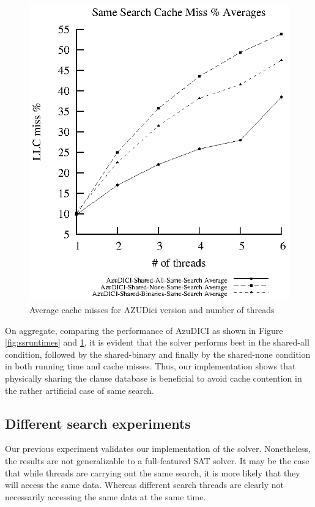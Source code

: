 \begin{figure}[htp]
  \centering
  \includegraphics[scale=1]{averageSS}
  \caption{Average cache misses for AZUDici version and number of
    threads}
  \label{fig:sscachemisses}
\end{figure}

On aggregate, comparing the performance of AzuDICI as shown in Figure
\ref{fig:ssruntimes} and \ref{fig:sscachemisses}, it is evident that
the solver performs best in the shared-all condition, followed by the
shared-binary and finally by the shared-none condition in both running
time and cache misses. Thus, our implementation shows that physically
sharing the clause database is beneficial to avoid cache contention in
the rather artificial case of same search.

\subsection{Different search experiments}
\label{sec:diffsearch}

Our previous experiment validates our implementation of the
solver. Nonetheless, the results are not generalizable to a
full-featured SAT solver. It may be the case that while threads are
carrying out the same search, it is more likely that they will access
the same data. Whereas different search threads are clearly not
necessarily accessing the same data at the same time.

